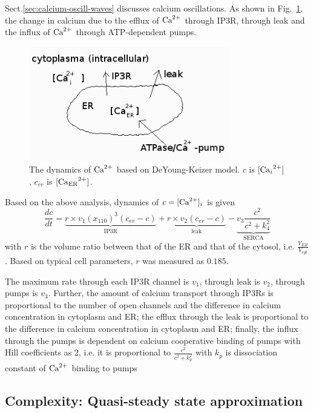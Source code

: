 Sect.\ref{sec:calcium-oscill-waves} discusses calcium oscillations.
As shown in Fig.~\ref{fig:DYK_Ca2+}, the change
in calcium due to the efflux of ${\text{Ca}^{2+}}$ through IP3R, through leak
and the influx of ${\text{Ca}^{2+}}$ through ATP-dependent 
pumps. 
\begin{figure}[hbt]
 \centerline{\includegraphics[height=5cm]{./images/DYK_Ca2+_dynamic.eps}}
\caption{The dynamics of ${\text{Ca}^{2+}}$  based on DeYoung-Keizer model. $c$
  is $[\ce{Ca_i^2+}]$, $c_{er}$ is $[\ce{Ca_{ER}^2+}]$.}
\label{fig:DYK_Ca2+}
\end{figure}

Based on the above analysis, dynamics of $c=[{\text{Ca}^{2+}}]_i$ is given
\begin{equation}
  \label{eq:344}
  \frac{dc}{dt} = \underbrace{r\times v_1(x_{110})^3(c_{er}-c)}_{\text{IP3R}}
  + \underbrace{r\times v_2(c_{er}-c)}_{\text{leak}} - 
 \underbrace{v_3\frac{c^2}{c^2+k_4^2}}_{\text{SERCA}}
\end{equation}
with $r$ is the volume ratio between that of the ER and that of the
cytosol, i.e. $\frac{V_{ER}}{V_{cyt}}$. Based on typical cell
parameters, $r$ was measured as $0.185$.

The maximum rate through each IP3R channel is $v_1$, through
leak is $v_2$, through pumps is $v_3$. Further, the amount of calcium
transport through IP3Rs is proportional to the number of open channels
and the difference in calcium concentration in cytoplasm and ER; the
efflux through the leak is proportional to the difference in calcium
concentration in cytoplasm and ER; finally, the influx through the
pumps is dependent on calcium cooperative binding of pumps with Hill
coefficients as 2, i.e.  it is proportional to $\frac{c^2}{c^2+k_p^2}$
with $k_p$ is dissociation constant of ${\text{Ca}^{2+}}$ binding to
pumps~\cite{carafoli1987cal}


\subsection{Complexity: Quasi-steady state approximation}
\label{sec:quasi-steady-state-IP3R}


